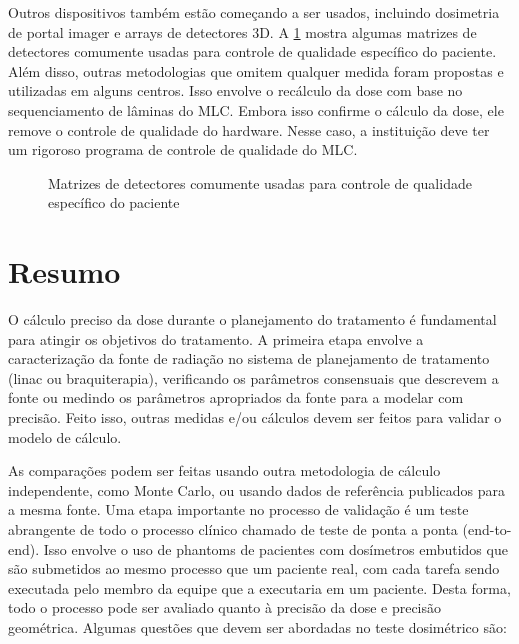 \documentclass[11pt,a4paper]{article}
\begin{document}
	Outros dispositivos também estão começando a ser usados, incluindo dosimetria de portal imager e arrays de detectores 3D. A \ref{fig:detectoresQaPacienteEspecifico} mostra algumas matrizes de detectores comumente usadas para controle de qualidade específico do paciente. Além disso, outras metodologias que omitem qualquer medida foram propostas e utilizadas em alguns centros. Isso envolve o recálculo da dose com base no sequenciamento de lâminas do MLC. Embora isso confirme o cálculo da dose, ele remove o controle de qualidade do hardware. Nesse caso, a instituição deve ter um rigoroso programa de controle de qualidade do MLC.

	\begin{figure}[h]
		\centering
		\caption{Matrizes de detectores comumente usadas para controle de qualidade específico do paciente}
		\label{fig:detectoresQaPacienteEspecifico}
	\end{figure}


\section{Resumo}

	O cálculo preciso da dose durante o planejamento do tratamento é fundamental para atingir os objetivos do tratamento. A primeira etapa envolve a caracterização da fonte de radiação no sistema de planejamento de tratamento (linac ou braquiterapia), verificando os parâmetros consensuais que descrevem a fonte ou medindo os parâmetros apropriados da fonte para a modelar com precisão. Feito isso, outras medidas e/ou cálculos devem ser feitos para validar o modelo de cálculo. 

	As comparações podem ser feitas usando outra metodologia de cálculo independente, como Monte Carlo, ou usando dados de referência publicados para a mesma fonte. Uma etapa importante no processo de validação é um teste abrangente de todo o processo clínico chamado de teste de ponta a ponta (end-to-end). Isso envolve o uso de phantoms de pacientes com dosímetros embutidos que são submetidos ao mesmo processo que um paciente real, com cada tarefa sendo executada pelo membro da equipe que a executaria em um paciente. Desta forma, todo o processo pode ser avaliado quanto à precisão da dose e precisão geométrica. Algumas questões que devem ser abordadas no teste dosimétrico são:
\end{document}
